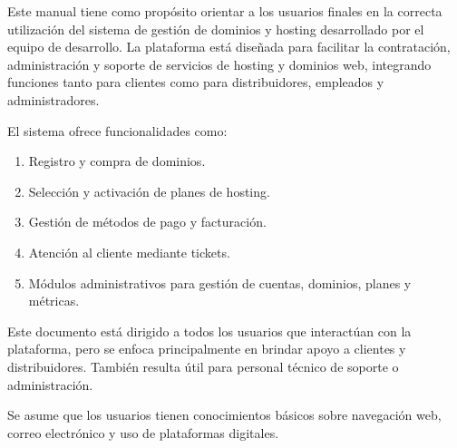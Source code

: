 Este manual tiene como propósito orientar a los usuarios finales en la correcta utilización del sistema de gestión de dominios y hosting desarrollado por el equipo de desarrollo. La plataforma está diseñada para facilitar la contratación, administración y soporte de servicios de hosting y dominios web, integrando funciones tanto para clientes como para distribuidores, empleados y administradores.

El sistema ofrece funcionalidades como:

\begin{enumerate}
    \item Registro y compra de dominios.
    \item Selección y activación de planes de hosting.
    \item Gestión de métodos de pago y facturación.
    \item Atención al cliente mediante tickets.
    \item Módulos administrativos para gestión de cuentas, dominios, planes y métricas.
\end{enumerate}

Este documento está dirigido a todos los usuarios que interactúan con la plataforma, pero se enfoca principalmente en brindar apoyo a clientes y distribuidores. También resulta útil para personal técnico de soporte o administración.

Se asume que los usuarios tienen conocimientos básicos sobre navegación web, correo electrónico y uso de plataformas digitales.
